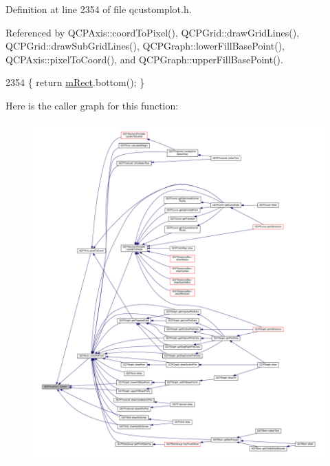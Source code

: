 Definition at line 2354 of file qcustomplot.\+h.



Referenced by Q\+C\+P\+Axis\+::coord\+To\+Pixel(), Q\+C\+P\+Grid\+::draw\+Grid\+Lines(), Q\+C\+P\+Grid\+::draw\+Sub\+Grid\+Lines(), Q\+C\+P\+Graph\+::lower\+Fill\+Base\+Point(), Q\+C\+P\+Axis\+::pixel\+To\+Coord(), and Q\+C\+P\+Graph\+::upper\+Fill\+Base\+Point().


\begin{DoxyCode}
2354 \{ \textcolor{keywordflow}{return} \hyperlink{class_q_c_p_layout_element_ad8896f05550389f7b9e92c9e6cdf6e01}{mRect}.bottom(); \}
\end{DoxyCode}


Here is the caller graph for this function\+:\nopagebreak
\begin{figure}[H]
\begin{center}
\leavevmode
\includegraphics[width=350pt]{class_q_c_p_axis_rect_af2b5982ebe7e6f781b9bf1cc371a60d8_icgraph}
\end{center}
\end{figure}


\hypertarget{class_q_c_p_axis_rect_a724b0333971ea6a338f0dbd814dc97ae}{}
